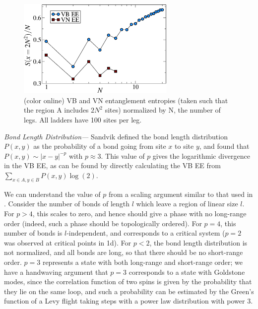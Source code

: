 \documentclass[prl,aps,twocolumn,floatfix,amsmath,amssymb,superscriptaddress,tightenlines]{revtex4}
\begin{document}
\begin{figure} { \includegraphics[width=3in]{fig4.eps} \caption{(color
online) VB and VN entanglement entropies (taken such that the region A
includes $2N^2$ sites) normalized by N, the number of legs.  All ladders
have 100 sites per leg.  \label{zigzag}}} \end{figure}

{\it Bond Length Distribution---} Sandvik defined the bond length distribution
$P(x,y)$ as the probability of a bond going from
site $x$ to site $y$, and found that $P(x,y)\sim |x-y|^{-p}$ with $p\approx 3$.  
This value of $p$ gives
the logarithmic divergence in the VB EE, as can be found by directly calculating
the
VB EE
from $\sum_{x\in A,y\in B} P(x,y) \log(2)$.

We can understand the value of $p$ from a scaling argument similar to that used in \cite{network}.
Consider the number of bonds of length $l$ which leave a region of linear size $l$.  For $p>4$, this
scales to zero, and hence should give a phase with no long-range order (indeed, such a phase should
be topologically ordered).  For $p=4$, this number of bonds is $l$-independent, and corresponds to a critical
system ($p=2$ was observed at critical points in 1d\cite{1dcritical}).
For $p<2$, the bond length distribution is not normalized, and all bonds are long, so that
there should be no short-range order.  $p=3$ represents a state with both long-range
and short-range order; we have a handwaving argument that $p=3$ corresponds to a state
with Goldstone modes, since the correlation function of two spins is given by the
probability that they lie on the same loop, and such a probability can be estimated by
the Green's function of a Levy flight taking steps with a power law distribution with power $3$.
\end{document}
